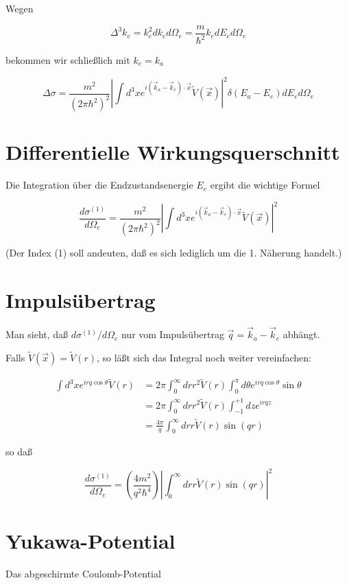 \documentclass[10pt, letterpaper]{article}
\begin{document}
Wegen

$$
\Delta^{3} k_{e}=k_{e}^{2} d k_{e} d \Omega_{e}=\frac{m}{\hbar^{2}} k_{e} d E_{e} d \Omega_{e}
$$

bekommen wir schließlich mit $k_{e}=k_{a}$

$$
\Delta \sigma=\frac{m^{2}}{\left(2 \pi \hbar^{2}\right)^{2}}\left|\int d^{3} x e^{i\left(\vec{k}_{a}-\vec{k}_{e}\right) \cdot \vec{x}} \tilde{V}(\vec{x})\right|^{2} \delta\left(E_{a}-E_{e}\right) d E_{e} d \Omega_{e}
$$

\section*{Differentielle Wirkungsquerschnitt}
Die Integration über die Endzustandsenergie $E_{e}$ ergibt die wichtige Formel

$$
\frac{d \sigma^{(1)}}{d \Omega_{e}}=\frac{m^{2}}{\left(2 \pi \hbar^{2}\right)^{2}}\left|\int d^{3} x e^{i\left(\vec{k}_{a}-\vec{k}_{e}\right) \cdot \vec{x}} \tilde{V}(\vec{x})\right|^{2}
$$

(Der Index (1) soll andeuten, daß es sich lediglich um die 1. Näherung handelt.)

\section*{Impulsübertrag}
Man sieht, daß $d \sigma^{(1)} / d \Omega_{e}$ nur vom Impulsübertrag $\vec{q}=\vec{k}_{a}-\vec{k}_{e}$ abhängt.

Falls $\tilde{V}(\vec{x})=\tilde{V}(r)$, so läßt sich das Integral noch weiter vereinfachen:

$$
\begin{aligned}
\int d^{3} x e^{i r q \cos \theta} \tilde{V}(r) & =2 \pi \int_{0}^{\infty} d r r^{2} \tilde{V}(r) \int_{0}^{\pi} d \theta e^{i r q \cos \theta} \sin \theta \\
& =2 \pi \int_{0}^{\infty} d r r^{2} \tilde{V}(r) \int_{-1}^{+1} d z e^{i r q z} \\
& =\frac{4 \pi}{q} \int_{0}^{\infty} d r r \tilde{V}(r) \sin (q r)
\end{aligned}
$$

so daß

$$
\frac{d \sigma^{(1)}}{d \Omega_{e}}=\left(\frac{4 m^{2}}{q^{2} \hbar^{4}}\right)\left|\int_{0}^{\infty} d r r \tilde{V}(r) \sin (q r)\right|^{2}
$$

\section*{Yukawa-Potential}
Das abgeschirmte Coulomb-Potential
\end{document}
